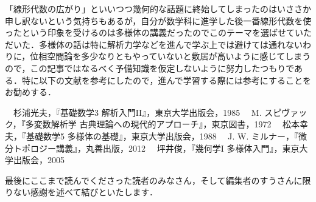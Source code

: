 「線形代数の広がり」といいつつ幾何的な話題に終始してしまったのはいささか申し訳ないという気持ちもあるが，自分が数学科に進学した後一番線形代数を使ったという印象を受けるのは多様体の講義だったのでこのテーマを選ばせていただいた．多様体の話は特に解析力学などを進んで学ぶ上では避けては通れないわりに，位相空間論を多少なりともやっていないと敷居が高いように感じてしまうので，この記事ではなるべく予備知識を仮定しないように努力したつもりである．特に以下の文献を参考にしたので，進んで学習する際には参考にすることをお勧めする．
\begin{thebibliography}{9}
\bibitem 　杉浦光夫，『基礎数学3 解析入門II』，東京大学出版会，1985
\bibitem 　M. スピヴァック，『多変数解析学 古典理論への現代的アプローチ』，東京図書，1972
\bibitem 　松本幸夫，『基礎数学5 多様体の基礎』，東京大学出版会，1988
\bibitem 　J. W. ミルナー，『微分トポロジー講義』，丸善出版，2012
\bibitem 　坪井俊，『幾何学I 多様体入門』，東京大学出版会，2005
\end{thebibliography}
最後にここまで読んでくださった読者のみなさん，そして編集者のすうさんに限りない感謝を述べて結びといたします．
